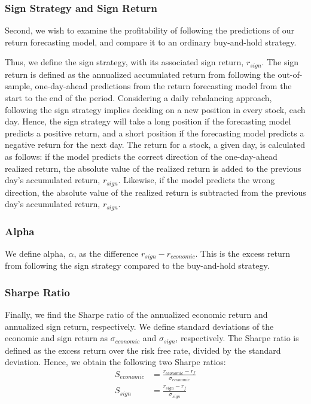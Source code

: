 \subsubsection{Sign Strategy and Sign Return}
Second, we wish to examine the profitability of following the predictions of our return forecasting model, and compare it to an ordinary buy-and-hold strategy. 

Thus, we define the sign strategy, with its associated sign return, $r_{sign}$. The sign return is defined as the annualized accumulated return from following the out-of-sample, one-day-ahead predictions from the return forecasting model from the start to the end of the period. Considering a daily rebalancing approach, following the sign strategy implies deciding on a new position in every stock, each day. Hence, the sign strategy will take a long position if the forecasting model predicts a positive return, and a short position if the forecasting model predicts a negative return for the next day. The return for a stock, a given day, is calculated as follows: if the model predicts the correct direction of the one-day-ahead realized return, the absolute value of the realized return is added to the previous day's accumulated return, $r_{sign}$. Likewise, if the model predicts the wrong direction, the absolute value of the realized return is subtracted from the previous day's accumulated return, $r_{sign}$. 

\subsubsection{Alpha}
We define alpha, $\alpha$, as the difference $r_{sign}-r_{economic}$. This is the excess return from following the sign strategy compared to the buy-and-hold strategy. 

\subsubsection{Sharpe Ratio}
Finally, we find the Sharpe ratio of the annualized economic return and annualized sign return, respectively. We define standard deviations of the economic and sign return as $\sigma_{economic}$ and $\sigma_{sign}$, respectively. The Sharpe ratio is defined as the excess return over the risk free rate, divided by the standard deviation. Hence, we obtain the following two Sharpe ratios:
\begin{align}
    S_{economic} &= \frac{r_{economic}-r_f}{\sigma_{economic}} \\
    S_{sign} &= \frac{r_{sign}-r_f}{\sigma_{sign}}
\end{align}
